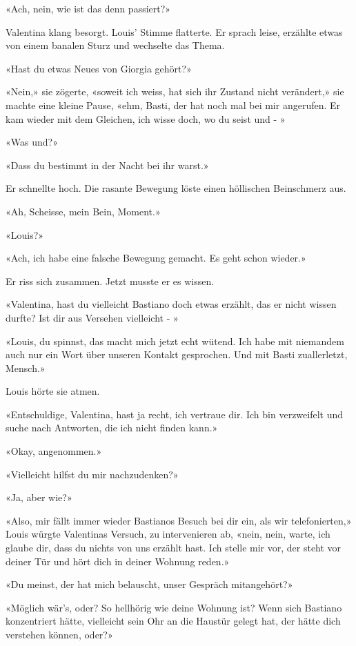 «Ach, nein, wie ist das denn passiert?»

Valentina klang besorgt. Louis’ Stimme flatterte. Er sprach leise, erzählte etwas von einem
banalen Sturz und wechselte das Thema.

«Hast du etwas Neues von Giorgia gehört?»

«Nein,» sie zögerte, «soweit ich weiss, hat sich ihr Zustand nicht
verändert,» sie machte eine kleine Pause, «ehm, Basti, der hat noch mal
bei mir angerufen. Er kam wieder mit dem Gleichen, ich wisse doch, wo du
seist und - »

«Was und?»

«Dass du bestimmt in der Nacht bei ihr warst.»

Er schnellte hoch. Die rasante Bewegung löste einen höllischen
Beinschmerz aus.

«Ah, Scheisse, mein Bein, Moment.»

«Louis?»

«Ach, ich habe eine falsche Bewegung gemacht. Es geht schon wieder.»

Er riss sich zusammen. Jetzt musste er es wissen.

«Valentina, hast du vielleicht Bastiano doch etwas erzählt, das er nicht
wissen durfte? Ist dir aus Versehen vielleicht - »

«Louis, du spinnst, das macht mich jetzt echt wütend. Ich habe mit
niemandem auch nur ein Wort über unseren Kontakt gesprochen. Und mit
Basti zuallerletzt, Mensch.»

Louis hörte sie atmen.

«Entschuldige, Valentina, hast ja recht, ich vertraue dir. Ich bin
verzweifelt und suche nach Antworten, die ich nicht finden kann.»

«Okay, angenommen.»

«Vielleicht hilfst du mir nachzudenken?»

«Ja, aber wie?»

«Also, mir fällt immer wieder Bastianos Besuch bei dir ein, als
wir telefonierten,» Louis würgte Valentinas Versuch, zu intervenieren
ab, «nein, nein, warte, ich glaube dir, dass du nichts von uns erzählt
hast. Ich stelle mir vor, der steht vor deiner Tür und hört dich in
deiner Wohnung reden.»

«Du meinst, der hat mich belauscht, unser Gespräch mitangehört?»

«Möglich wär’s, oder? So hellhörig wie deine Wohnung ist? Wenn sich
Bastiano konzentriert hätte, vielleicht sein Ohr an die Haustür gelegt
hat, der hätte dich verstehen können, oder?»

